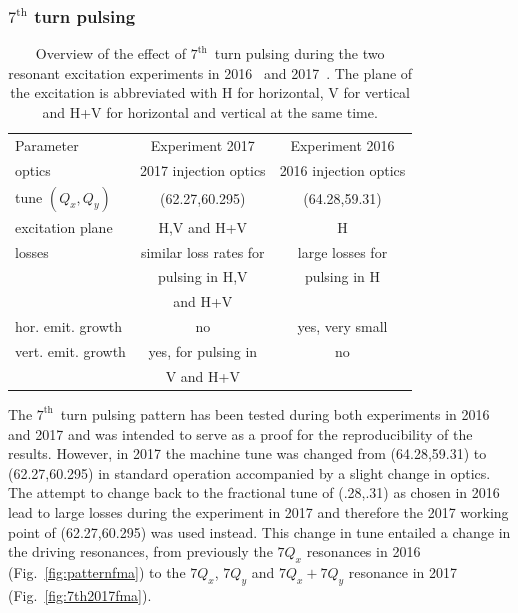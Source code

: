 \documentclass[%
 reprint,
 amsmath,amssymb,
 aps,
prstab,
]{revtex4-1}
\begin{document}
\subsubsection{$7^{\mathrm{th}}$ turn pulsing\label{sec:simex7}}
\begin{table}[h]
	\caption{\label{tab:7thexp}%
		Overview of the effect of $7^{\mathrm{th}}$~turn pulsing during the two resonant excitation experiments in 2016~\cite{resexmd2016} and 2017~\cite{resexmd2017}. The plane of the excitation is abbreviated with H for horizontal, V for vertical and H+V for horizontal and vertical at the same time.
	}
	\begin{ruledtabular}
		\begin{tabular}{lcc}
			Parameter & Experiment 2017 & Experiment 2016  \\
			\colrule
			optics & 2017 injection optics & 2016 injection optics \\
			tune $(Q_x,Q_y)$ & (62.27,60.295) & (64.28,59.31)\\\hline
			excitation plane  & H,V and H+V&  H\\
			losses & similar loss rates for  & large losses for \\
			& pulsing in H,V &  pulsing in H \\
			&  and H+V & \\
			hor. emit. growth & no & yes, very small \\
			vert. emit. growth & yes, for pulsing in & no\\
			&  V and H+V & \\
		\end{tabular}
	\end{ruledtabular}
\end{table}
The $7^{\mathrm{th}}$~turn pulsing pattern has been tested during both experiments in 2016 and 2017 and was intended to serve as a proof for the reproducibility of the results. However, in 2017 the machine tune was changed from (64.28,59.31) to (62.27,60.295) in standard operation accompanied by a slight change in optics. The attempt to change back to the fractional tune of (.28,.31) as chosen in 2016 lead to large losses during the experiment in 2017 and therefore the 2017 working point of (62.27,60.295) was used instead. This change in tune entailed a change in the driving resonances, from previously the $7Q_x$ resonances in 2016 (Fig.~\ref{fig:patternfma}) to the $7Q_x$, $7Q_y$ and $7Q_x + 7Q_y$ resonance in 2017 (Fig.~\ref{fig:7th2017fma}).
\end{document}
